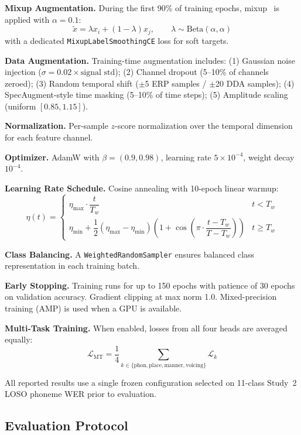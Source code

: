 \documentclass[11pt,a4paper]{article}
\begin{document}
\textbf{Mixup Augmentation.} During the first 90\% of training epochs,
mixup~\cite{zhang2018} is applied with $\alpha = 0.1$:
\[
  \tilde{x} = \lambda x_i + (1-\lambda) x_j, \qquad \lambda \sim
  \text{Beta}(\alpha, \alpha)
\]
with a dedicated \texttt{MixupLabelSmoothingCE} loss for soft targets.

\textbf{Data Augmentation.} Training-time augmentation includes:
(1) Gaussian noise injection ($\sigma = 0.02 \times \text{signal std}$);
(2) Channel dropout (5--10\% of channels zeroed);
(3) Random temporal shift ($\pm$5 ERP samples / $\pm$20 DDA samples);
(4) SpecAugment-style time masking (5--10\% of time steps);
(5) Amplitude scaling (uniform $[0.85, 1.15]$).

\textbf{Normalization.} Per-sample $z$-score normalization over the temporal
dimension for each feature channel.

\textbf{Optimizer.} AdamW with $\beta = (0.9, 0.98)$, learning rate
$5 \times 10^{-4}$, weight decay $10^{-4}$.

\textbf{Learning Rate Schedule.} Cosine annealing with 10-epoch linear warmup:
\[
  \eta(t) = \begin{cases}
    \eta_{\max} \cdot \dfrac{t}{T_w} & t < T_w \\[6pt]
    \eta_{\min} + \dfrac{1}{2}(\eta_{\max} - \eta_{\min})
    \!\left(1 + \cos\!\left(\pi \cdot \dfrac{t - T_w}{T - T_w}\right)\right)
    & t \geq T_w
  \end{cases}
\]

\textbf{Class Balancing.} A \texttt{WeightedRandomSampler} ensures balanced
class representation in each training batch.

\textbf{Early Stopping.} Training runs for up to 150 epochs with patience of 30
epochs on validation accuracy. Gradient clipping at max norm 1.0.
Mixed-precision training (AMP) is used when a GPU is available.

\textbf{Multi-Task Training.} When enabled, losses from all four heads are
averaged equally:
\[
  \mathcal{L}_{\text{MT}} = \frac{1}{4}
  \sum_{k \in \{\text{phon},\text{place},\text{manner},\text{voicing}\}}
  \mathcal{L}_k
\]

All reported results use a single frozen configuration selected on
11-class Study~2 LOSO phoneme WER prior to evaluation.

\subsection{Evaluation Protocol}
\end{document}
